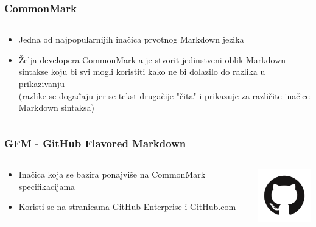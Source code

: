\documentclass{beamer}
\begin{document}
\begin{frame}
	\frametitle{CommonMark}

 	\begin{minipage}[0.2\textheight]{\textwidth}
 	\begin{columns}[T]
 	\begin{column}{0.8\textwidth}
 	\begin{itemize}
		\item{Jedna od najpopularnijih inačica prvotnog Markdown jezika}
		\item{Želja developera CommonMark-a je stvorit jedinstveni oblik Markdown sintakse koju bi svi mogli koristiti kako ne bi dolazilo do razlika u prikazivanju \\(razlike se događaju jer se tekst drugačije "čita" i prikazuje za različite inačice Markdown sintaksa)}
	\end{itemize}
	\end{column}
	\end{columns}
	\end{minipage}

\end{frame}





\begin{frame}
	\frametitle{GFM - GitHub Flavored Markdown}

 	\begin{minipage}[0.2\textheight]{\textwidth}
 	\begin{columns}[T]
 	\begin{column}{0.8\textwidth}
 	\begin{itemize}
		\item{Inačica koja se bazira ponajviše na CommonMark specifikacijama}
		\item{Koristi se na stranicama GitHub Enterprise i \href{https://github.com/}{GitHub.com}}
	\end{itemize}
	\end{column}
	\begin{column}{0.2\textwidth}
	\includegraphics[width=2.5cm]{Slike/githublogo.png}
	\end{column}
	\end{columns}
	\end{minipage}

\end{frame}
\end{document}
